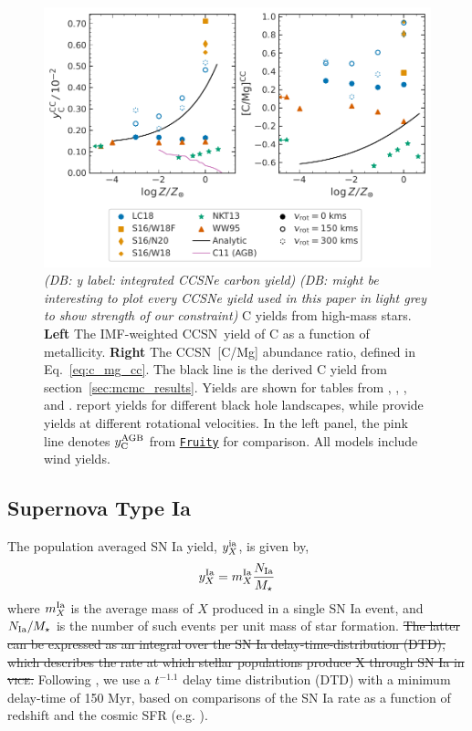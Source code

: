 \documentclass[fleqn,
usenatbib]{mnras}
\newcommand{\VICE}{\textsc{vice}}
\newcommand{\fruity}{\texttt{\hyperlink{fruity}{Fruity}}}
\newcommand{\cc}{CCSN}
\newcommand{\Ycagb}{{y_{\rm C}^{\rm AGB}}}
\newcommand{\dbstrike}[1]{{\color{Thistle} \sout{#1} }}
\newcommand{\dbnote}[1]{ {\color{Thistle} \textit{\small (DB: #1)}} }
\begin{document}
\begin{figure}
    \centering
    \includegraphics{cc_yields.pdf}
    \caption[]{
    \dbnote{y label: integrated CCSNe carbon yield}
    \dbnote{might be interesting to plot every CCSNe yield used in this paper in light grey to show strength of our constraint}
        C yields from high-mass stars.
        \textbf{Left} The IMF-weighted \cc\ yield of C as a function of metallicity.
        \textbf{Right} The \cc\ [C/Mg] abundance ratio, defined in Eq.~\ref{eq:c_mg_cc}. The black line is the derived C yield from section~\ref{sec:mcmc_results}. Yields are shown for tables from 
    \citet[red triangles]{WW95}, \citet[orange square and diamond]{sukhbold+16}, 
    \citet[green stars]{NKT13}, and \citet[blue circles]{LC18}. \citet{sukhbold+16} report yields for different black hole landscapes, while \citet{LC18} provide yields at different rotational velocities.
    In the left panel, the pink line denotes $\Ycagb$ from \fruity{} for comparison. All models include wind yields. 
}
    \label{fig:y_cc}
\end{figure}


\subsection{Supernova Type Ia}
The population averaged SN Ia yield, $y_{X}^{\rm ia}$, is given by,
\begin{equation}
    y_{X}^{\rm Ia} = m_{X}^{\rm Ia} \frac{N_{\rm Ia}}{M_\star}
\end{equation}
where $m_{X}^{\rm Ia}$ is the average mass of $X$ produced in a single SN Ia event, and $N_{\rm Ia} / M_\star$ is the number of such events per unit mass of star formation. \dbstrike{The latter can be expressed as an integral over the SN Ia delay-time-distribution (DTD), which describes the rate at which stellar populations produce X through SN Ia in \VICE.} Following \citet{james+23}, we use a $t^{-1.1}$  delay time distribution (DTD) with a minimum delay-time of 150 Myr, based on comparisons of the SN Ia rate as a function of redshift and the cosmic SFR (e.g. \citealt{maoz+12}). 
\end{document}
